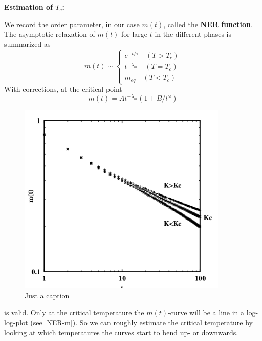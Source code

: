 	\textbf{Estimation of $T_c$:}
	
	We record the order parameter, in our case $m(t)$, called the \textbf{NER function}. The asymptotic relaxation of $m(t)$ for large $t$ in the different phases is summarized as
	\begin{equation}
		m(t) \sim \begin{cases}
			e^{-t /	\tau} \quad (T > T_c) \\
			t^{-\lambda_m} \quad (T =	T_c) \\
			m_{eq} \quad (T < T_c)
		\end{cases}
	\end{equation}
	With corrections, at the critical point
	\begin{equation}
		m(t) =	A t^{-\lambda_m} (1 + B / t^\omega)
	\end{equation}
	\begin{figure}[htp]
		\centering
		\includegraphics[width=10cm]{graphics/NER-m.png}
		\caption{Just a caption}
		\label{NER-m}
	\end{figure}
	
	is valid. Only at the critical temperature the $m(t)$-curve will be a line in a log-log-plot (see \autoref{NER-m}). So we can roughly estimate the critical temperature by looking at which temperatures the curves start to bend up- or downwards.
	
